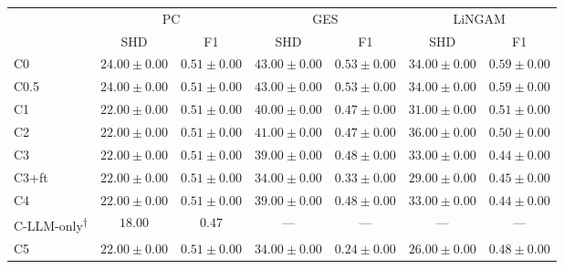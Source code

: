 \begin{tabular}{l|cc|cc|cc}
\hline
 & \multicolumn{2}{c|}{PC} & \multicolumn{2}{c|}{GES} & \multicolumn{2}{c}{LiNGAM} \\
 & SHD & F1 & SHD & F1 & SHD & F1 \\
\hline
C0 & $24.00 \pm 0.00$ & $0.51 \pm 0.00$ & $43.00 \pm 0.00$ & $0.53 \pm 0.00$ & $34.00 \pm 0.00$ & $0.59 \pm 0.00$ \\
C0.5 & $24.00 \pm 0.00$ & $0.51 \pm 0.00$ & $43.00 \pm 0.00$ & $0.53 \pm 0.00$ & $34.00 \pm 0.00$ & $0.59 \pm 0.00$ \\
C1 & $22.00 \pm 0.00$ & $0.51 \pm 0.00$ & $40.00 \pm 0.00$ & $0.47 \pm 0.00$ & $31.00 \pm 0.00$ & $0.51 \pm 0.00$ \\
C2 & $22.00 \pm 0.00$ & $0.51 \pm 0.00$ & $41.00 \pm 0.00$ & $0.47 \pm 0.00$ & $36.00 \pm 0.00$ & $0.50 \pm 0.00$ \\
C3 & $22.00 \pm 0.00$ & $0.51 \pm 0.00$ & $39.00 \pm 0.00$ & $0.48 \pm 0.00$ & $33.00 \pm 0.00$ & $0.44 \pm 0.00$ \\
C3+ft & $22.00 \pm 0.00$ & $0.51 \pm 0.00$ & $34.00 \pm 0.00$ & $0.33 \pm 0.00$ & $29.00 \pm 0.00$ & $0.45 \pm 0.00$ \\
C4 & $22.00 \pm 0.00$ & $0.51 \pm 0.00$ & $39.00 \pm 0.00$ & $0.48 \pm 0.00$ & $33.00 \pm 0.00$ & $0.44 \pm 0.00$ \\
C-LLM-only\textsuperscript{$\dagger$} & $18.00$ & $0.47$ & --- & --- & --- & --- \\ %
C5 & $22.00 \pm 0.00$ & $0.51 \pm 0.00$ & $34.00 \pm 0.00$ & $0.24 \pm 0.00$ & $26.00 \pm 0.00$ & $0.48 \pm 0.00$ \\
\hline
\end{tabular}
